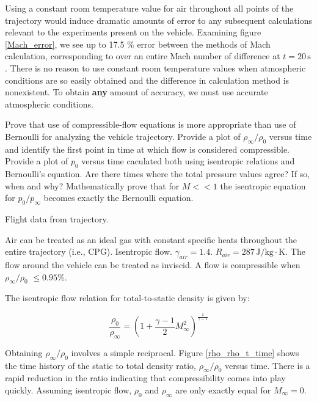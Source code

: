 \documentclass[../main.tex]{subfiles}
\begin{document}
\discussion{}

Using a constant room temperature value for air throughout all points of the trajectory would induce dramatic amounts of error to any subsequent calculations relevant to the experiments present on the vehicle.
Examining figure \ref{Mach_error}, we see up to 17.5 \% error between the methods of Mach calculation, corresponding to over an entire Mach number of difference at \(t=20\,\unit{\s}\).
There is no reason to use constant room temperature values when atmospheric conditions are so easily obtained and the difference in calculation method is nonexistent. 
To obtain \textbf{any} amount of accuracy, we must use accurate atmospheric conditions.

\clearpage


Prove that use of compressible-flow equations is more appropriate than use of Bernoulli for analyzing the vehicle trajectory.
Provide a plot of \(\rho_\infty/\rho_0\) versus time and identify the first point in time at which flow is considered compressible.
Provide a plot of \(p_0\) versus time caculated both using isentropic relations and Bernoulli's equation.
Are there times where the total pressure values agree?
If so, when and why?
Mathematically prove that for \(M<<1\) the isentropic equation for \(p_0/p_\infty\) becomes exactly the Bernoulli equation.

\givens{}
Flight data from trajectory.

\assumptions{}
Air can be treated as an ideal gas with constant specific heats throughout the entire trajectory (i.e., CPG).
Isentropic flow.
\(\gamma_{air} = 1.4\). 
\(R_{air} = 287 \, \unit{\joule/\kilogram\cdot\kelvin}\). 
The flow around the vehicle can be treated as inviscid.
A flow is compressible when \(\rho_\infty/\rho_0\) \(\le 0.95\%\). 

\solution{}

The isentropic flow relation for total-to-static density is given by:

\[
    \frac{\rho_0}{\rho_\infty} = \left({1 + \frac{\gamma-1}{2} M_\infty^2}\right) ^ {\frac{1}{\gamma-1}}   
\]

Obtaining \(\rho_\infty/\rho_0\) involves a simple reciprocal.
Figure \ref{rho_rho_t_time} shows the time history of the static to total density ratio, \(\rho_\infty/\rho_0\) versus time.
There is a rapid reduction in the ratio indicating that compressibility comes into play quickly. 
Assuming isentropic flow, \(\rho_0\) and \(\rho_\infty\) are only exactly equal for \(M_\infty=0\).
\end{document}
